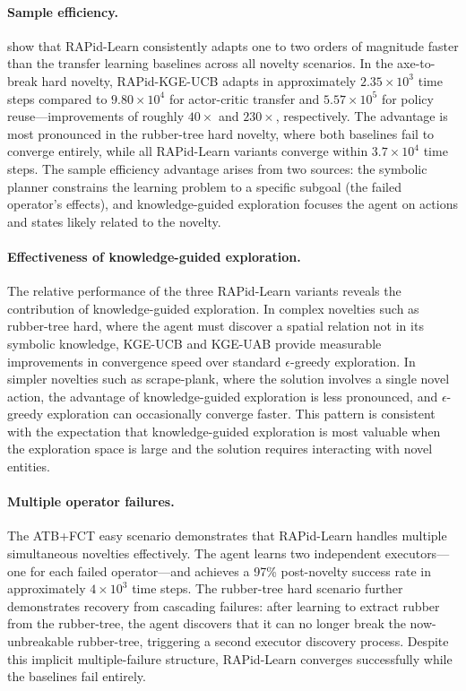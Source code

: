 \paragraph{Sample efficiency.}  show that RAPid-Learn consistently adapts one to two orders of magnitude faster than the transfer learning baselines across all novelty scenarios. In the axe-to-break hard novelty, RAPid-KGE-UCB adapts in approximately $2.35 \times 10^3$ time steps compared to $9.80 \times 10^4$ for actor-critic transfer and $5.57 \times 10^5$ for policy reuse---improvements of roughly $40\times$ and $230\times$, respectively. The advantage is most pronounced in the rubber-tree hard novelty, where both baselines fail to converge entirely, while all RAPid-Learn variants converge within $3.7 \times 10^4$ time steps. The sample efficiency advantage arises from two sources: the symbolic planner constrains the learning problem to a specific subgoal (the failed operator's effects), and knowledge-guided exploration focuses the agent on actions and states likely related to the novelty.

\paragraph{Effectiveness of knowledge-guided exploration.} The relative performance of the three RAPid-Learn variants reveals the contribution of knowledge-guided exploration. In complex novelties such as rubber-tree hard, where the agent must discover a spatial relation not in its symbolic knowledge, KGE-UCB and KGE-UAB provide measurable improvements in convergence speed over standard $\epsilon$-greedy exploration. In simpler novelties such as scrape-plank, where the solution involves a single novel action, the advantage of knowledge-guided exploration is less pronounced, and $\epsilon$-greedy exploration can occasionally converge faster. This pattern is consistent with the expectation that knowledge-guided exploration is most valuable when the exploration space is large and the solution requires interacting with novel entities.

\paragraph{Multiple operator failures.} The ATB+FCT easy scenario demonstrates that RAPid-Learn handles multiple simultaneous novelties effectively. The agent learns two independent executors---one for each failed operator---and achieves a 97\% post-novelty success rate in approximately $4 \times 10^3$ time steps. The rubber-tree hard scenario further demonstrates recovery from cascading failures: after learning to extract rubber from the rubber-tree, the agent discovers that it can no longer break the now-unbreakable rubber-tree, triggering a second executor discovery process. Despite this implicit multiple-failure structure, RAPid-Learn converges successfully while the baselines fail entirely.

